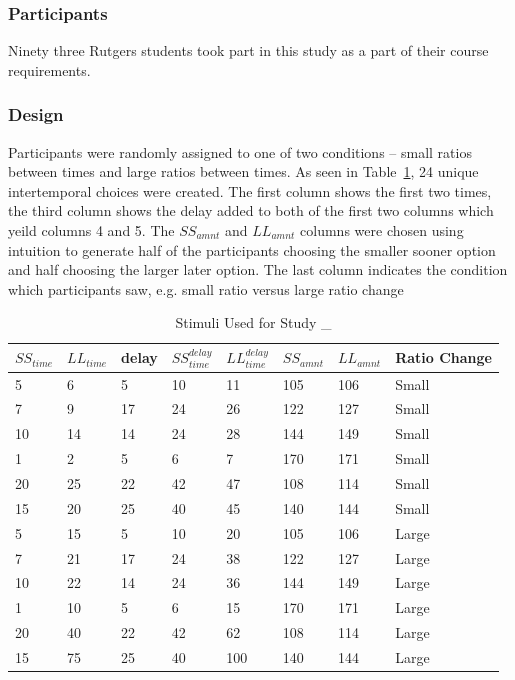 \documentclass[]{article}
\begin{document}
\subsubsection{Participants}

Ninety three Rutgers students took part in this study as a part of their course requirements. 

\subsubsection{Design}

Participants were randomly assigned to one of two conditions -- small ratios between times and large ratios between times.  
As seen in Table~\ref{tab:stimuli}, 24 unique intertemporal choices were created. 
The first column shows the first two times, the third column shows the delay added to both of the first two columns which yeild columns 4 and 5. 
The $SS_{amnt}$ and $LL_{amnt}$ columns were chosen using intuition to generate half of the participants choosing the smaller sooner option and half choosing the larger later option. 
The last column indicates the condition which participants saw, e.g. small ratio versus large ratio change

\begin{table}[!htbp] \centering 
	\caption{Stimuli Used for Study \_ } \label{tab:stimuli}
\begin{tabular}{ | l | l | l | l | l | l | l | l | }
	\hline
	$SS_{time}$ & $LL_{time}$ & delay & $SS_{time}^{delay}$ & $LL_{time}^{delay}$ & $SS_{amnt}$ & $LL_{amnt}$ & Ratio Change \\ \hline
	5 & 6 & 5 & 10 & 11 & 105 & 106 & Small  \\ \hline
	7 & 9 & 17 & 24 & 26 & 122 & 127 & Small  \\ \hline
	10 & 14 & 14 & 24 & 28 & 144 & 149 & Small  \\ \hline
	1 & 2 & 5 & 6 & 7 & 170 & 171 & Small  \\ \hline
	20 & 25 & 22 & 42 & 47 & 108 & 114 & Small  \\ \hline
	15 & 20 & 25 & 40 & 45 & 140 & 144 & Small  \\ \hline
	5 & 15 & 5 & 10 & 20 & 105 & 106 & Large \\ \hline
	7 & 21 & 17 & 24 & 38 & 122 & 127 & Large \\ \hline
	10 & 22 & 14 & 24 & 36 & 144 & 149 & Large \\ \hline
	1 & 10 & 5 & 6 & 15 & 170 & 171 & Large \\ \hline
	20 & 40 & 22 & 42 & 62 & 108 & 114 & Large \\ \hline
	15 & 75 & 25 & 40 & 100 & 140 & 144 & Large \\ \hline
\end{tabular}
\end{table}
\end{document}
